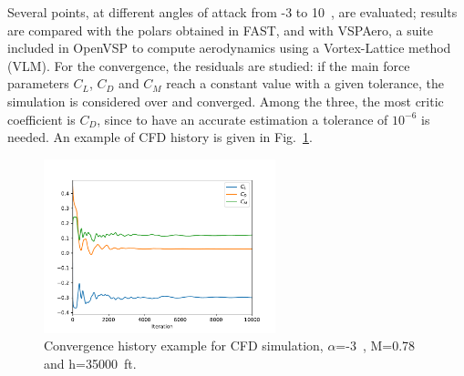 Several points, at different angles of attack from -3 to 10~\si{\deg}, are evaluated; results are compared with the polars obtained in FAST, and with VSPAero, a suite included in OpenVSP to compute aerodynamics using a Vortex-Lattice method (VLM).
For the convergence, the residuals are studied: if the main force parameters $C_L$, $C_D$ and $C_M$ reach a constant value with a given tolerance, the simulation is considered over and converged.
Among the three, the most critic coefficient is $C_D$, since to have an accurate estimation a tolerance of $10^{-6}$ is needed.
An example of CFD history is given in Fig.~\ref{fig:cfd_conv_history}.
\begin{figure}[!h]
	\centering
	\includegraphics[keepaspectratio, width=0.6\textwidth]{images/chap4/cfd_hist_example}
	\caption{Convergence history example for CFD simulation, $\alpha$=-3~\si{\deg}, M=0.78 and h=35000~ft.}
	\label{fig:cfd_conv_history}
\end{figure}

